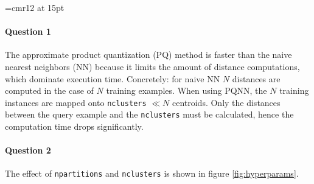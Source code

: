 \documentclass[10pt]{article}
\begin{document}
\font\myfont=cmr12 at 15pt

\title{\vspace{-2.5cm}{\myfont Assignment 3: BDAP [B-KUL-H00Y4A]}}
\author{Andreas Hinderyckx}
\date{} %


\maketitle

\vspace{-1cm}
\paragraph{Question 1}
The approximate product quantization (PQ) method is faster than the naive nearest neighbors (NN) because it limits the amount of distance computations, which dominate execution time. Concretely: for naive NN $N$ distances are computed in the case of $N$ training examples. When using PQNN, the $N$ training instances are mapped onto \texttt{nclusters} $\ll N$ centroids. Only the distances between the query example and the \texttt{nclusters} must be calculated, hence the computation time drops significantly.

\vspace{-.3cm}
\paragraph{Question 2} The effect of \texttt{npartitions} and \texttt{nclusters} is shown in figure \ref{fig:hyperparams}.
\end{document}
